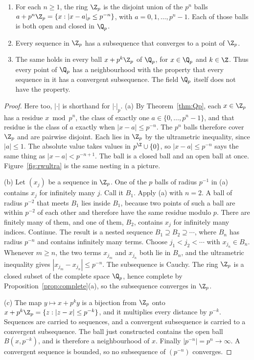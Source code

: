 \begin{corollary}[$\Z_p$ is compact]\label{cor:Zpcompact}
\begin{enumerate}[label=(\alph*)]
\item For each $n\ge1$, the ring $\Z_p$ is the disjoint union of the $p^n$ balls $a+p^n\Z_p=\{x:|x-a|_p\le p^{-n}\}$, with $a=0,1,\dots,p^n-1$. Each of those balls is both open and closed in $\Q_p$.
\item Every sequence in $\Z_p$ has a subsequence that converges to a point of $\Z_p$.
\item The same holds in every ball $x+p^k\Z_p$ of $\Q_p$, for $x\in\Q_p$ and $k\in\Z$. Thus every point of $\Q_p$ has a neighbourhood with the property that every sequence in it has a convergent subsequence. The field $\Q_p$ itself does not have the property.
\end{enumerate}
\end{corollary}
\begin{proof}
Here too, $|\cdot|$ is shorthand for $|\cdot|_p$. (a) By Theorem~\ref{thm:Qp}, each $x\in\Z_p$ has a residue $x\bmod p^n$, the class of exactly one $a\in\{0,\dots,p^n-1\}$, and that residue is the class of $a$ exactly when $|x-a|\le p^{-n}$. The $p^n$ balls therefore cover $\Z_p$ and are pairwise disjoint. Each lies in $\Z_p$ by the ultrametric inequality, since $|a|\le1$. The absolute value takes values in $p^{\Z}\cup\{0\}$, so $|x-a|\le p^{-n}$ says the same thing as $|x-a|<p^{-n+1}$. The ball is a closed ball and an open ball at once. Figure~\ref{fig:rwultra} is the same nesting in a picture.

(b) Let $(x_j)$ be a sequence in $\Z_p$. One of the $p$ balls of radius $p^{-1}$ in (a) contains $x_j$ for infinitely many $j$. Call it $B_1$. Apply (a) with $n=2$. A ball of radius $p^{-2}$ that meets $B_1$ lies inside $B_1$, because two points of such a ball are within $p^{-2}$ of each other and therefore have the same residue modulo $p$. There are finitely many of them, and one of them, $B_2$, contains $x_j$ for infinitely many indices. Continue. The result is a nested sequence $B_1\supseteq B_2\supseteq\cdots$, where $B_n$ has radius $p^{-n}$ and contains infinitely many terms. Choose $j_1<j_2<\cdots$ with $x_{j_n}\in B_n$. Whenever $m\ge n$, the two terms $x_{j_m}$ and $x_{j_n}$ both lie in $B_n$, and the ultrametric inequality gives $|x_{j_m}-x_{j_n}|\le p^{-n}$. The subsequence is Cauchy. The ring $\Z_p$ is a closed subset of the complete space $\Q_p$, hence complete by Proposition~\ref{prop:complete}(a), so the subsequence converges in $\Z_p$.

(c) The map $y\mapsto x+p^ky$ is a bijection from $\Z_p$ onto $x+p^k\Z_p=\{z:|z-x|\le p^{-k}\}$, and it multiplies every distance by $p^{-k}$. Sequences are carried to sequences, and a convergent subsequence is carried to a convergent subsequence. The ball just constructed contains the open ball $B(x,p^{-k})$, and is therefore a neighbourhood of $x$. Finally $|p^{-n}|=p^n\to\infty$. A convergent sequence is bounded, so no subsequence of $(p^{-n})$ converges.
\end{proof}

